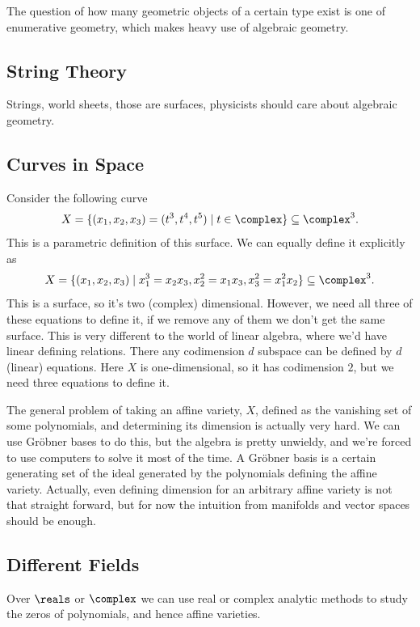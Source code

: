 \documentclass[fleqn]{NotesClass}
\begin{document}
    The question of how many geometric objects of a certain type exist is one of enumerative geometry, which makes heavy use of algebraic geometry.
    
    \subsection{String Theory}
    Strings, world sheets, those are surfaces, physicists should care about algebraic geometry.
    
    \subsection{Curves in Space}
    Consider the following curve
    \begin{equation}
        X = \{(x_1, x_2, x_3) = (t^3, t^4, t^5) \mid t \in \complex\} \subseteq \complex^3.
    \end{equation}
    This is a parametric definition of this surface.
    We can equally define it explicitly as
    \begin{equation}
        X = \{(x_1, x_2, x_3) \mid x_1^3 = x_2x_3, x_2^2 = x_1x_3, x_3^2 = x_1^2x_2\} \subseteq \complex^3.
    \end{equation}
    This is a surface, so it's two (complex) dimensional.
    However, we need all three of these equations to define it, if we remove any of them we don't get the same surface.
    This is very different to the world of linear algebra, where we'd have linear defining relations.
    There any codimension \(d\) subspace can be defined by \(d\) (linear) equations.
    Here \(X\) is one-dimensional, so it has codimension \(2\), but we need three equations to define it.
    
    The general problem of taking an affine variety, \(X\), defined as the vanishing set of some polynomials, and determining its dimension is actually very hard.
    We can use Gr\"obner bases to do this, but the algebra is pretty unwieldy, and we're forced to use computers to solve it most of the time.
    A Gr\"obner basis is a certain generating set of the ideal generated by the polynomials defining the affine variety.
    Actually, even defining dimension for an arbitrary affine variety is not that straight forward, but for now the intuition from manifolds and vector spaces should be enough.
    
    \subsection{Different Fields}
    Over \(\reals\) or \(\complex\) we can use real or complex analytic methods to study the zeros of polynomials, and hence affine varieties.
    
\end{document}
